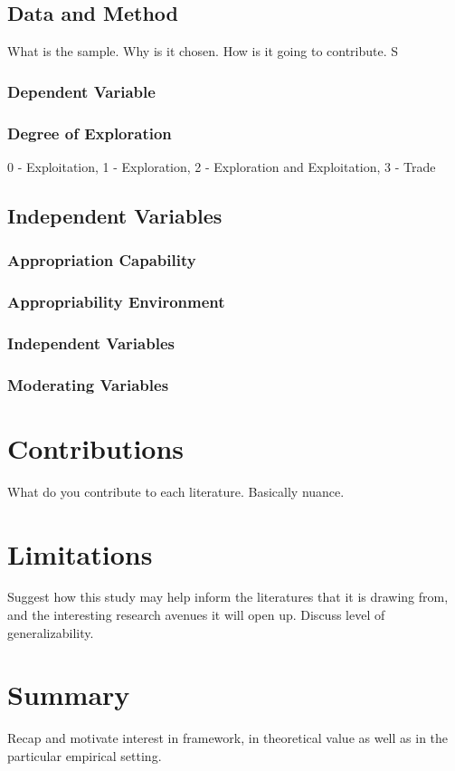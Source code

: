 \documentclass[12pt,letterpaper]{article}
\begin{document}
\subsection{Data and Method}

What is the sample. Why is it chosen. How is it going to contribute. S
\subsubsection{Dependent Variable}


\subsubsection{Degree of Exploration} \par
0 - Exploitation, 1 - Exploration, 2 - Exploration and Exploitation, 3 - Trade \par
\subsection{Independent Variables}

\subsubsection{Appropriation Capability}
\subsubsection{Appropriability Environment}

\subsubsection{Independent Variables}

\subsubsection{Moderating Variables}

\section{Contributions}
What do you contribute to each literature. Basically nuance. 

\section{Limitations}
Suggest how this study may help inform the literatures that it is drawing from, and the interesting research avenues it will open up. Discuss level of generalizability.

\section{Summary}
Recap and motivate interest in framework, in theoretical value as well as in the particular empirical setting.

\renewcommand{\refname}{REFERENCES}
 

\end{document}
